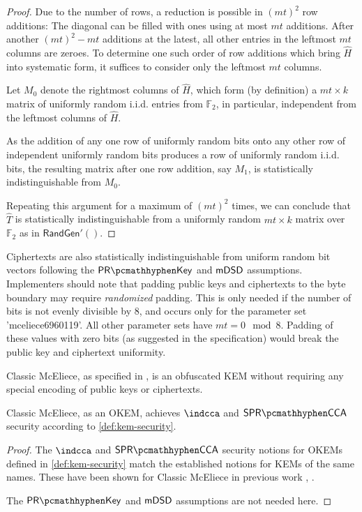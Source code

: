 \begin{proof}
    Due to the number of rows, a reduction is possible in $(mt)^2$ row additions: The diagonal can be filled with ones using at most $mt$ additions. After another $(mt)^2-mt$ additions at the latest, all other entries in the leftmost $mt$ columns are zeroes. To determine one such order of row additions which bring $\hat H$ into systematic form, it suffices to consider only the leftmost $mt$ columns.
    
    Let $M_0$ denote the rightmost columns of $\hat H$, which form (by definition) a $mt \times k$ matrix of uniformly random i.i.d. entries from $\mathbb F_2$, in particular, independent from the leftmost columns of $\hat H$.
    
    As the addition of any one row of uniformly random bits onto any other row of independent uniformly random bits produces a row of uniformly random i.i.d. bits, the resulting matrix after one row addition, say $M_1$, is statistically indistinguishable from $M_0$.
    
    Repeating this argument for a maximum of $(mt)^2$ times, we can conclude that $\hat T$ is statistically indistinguishable from a uniformly random $mt \times k$ matrix over $\mathbb F_2$ as in $\textsf{RandGen}'()$.
\end{proof}

Ciphertexts are also statistically indistinguishable from uniform random bit vectors following the $\prkey$ and $\mathsf{mDSD}$ assumptions. Implementers should note that padding public keys and ciphertexts to the byte boundary may require \emph{randomized} padding. This is only needed if the number of bits is not evenly divisible by 8, and occurs only for the parameter set 'mceliece6960119'.  All other parameter sets have $mt = 0 \mod 8$. Padding of these values with zero bits (as suggested in the specification) would break the public key and ciphertext uniformity.

\begin{theorem}
    Classic McEliece, as specified in \cite{NISTPQC-R4:ClassicMcEliece22}, is an obfuscated KEM without requiring any special encoding of public keys or ciphertexts.

    Classic McEliece, as an OKEM, achieves $\indcca$ and $\sprcca$ security according to \cref{def:kem-security}.
\end{theorem}
\begin{proof}
    The $\indcca$ and $\sprcca$ security notions for OKEMs defined in \cref{def:kem-security} match the established notions for KEMs of the same names. These have been shown for Classic McEliece in previous work \cite{EC:Xagawa22}, \cite[security.pdf: Section 5]{NISTPQC-R4:ClassicMcEliece22}.

    The $\prkey$ and $\mathsf{mDSD}$ assumptions are not needed here.
\end{proof}

